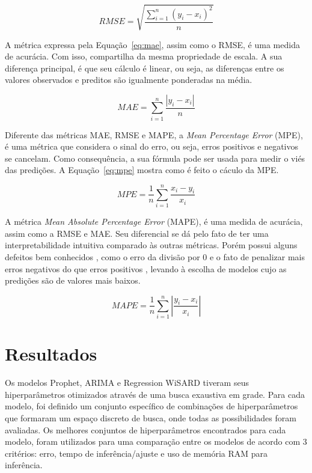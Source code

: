 \begin{equation} \label{eq:rmse}
    RMSE=\sqrt{\dfrac{\sum ^{n}_{i=1}\left( y_{i}-x_{i}\right) ^{2}}{n}}
\end{equation}

A métrica expressa pela Equação~\ref{eq:mae}, assim como o RMSE, é uma medida de acurácia. Com isso, compartilha da mesma propriedade de escala. A sua diferença principal, é que seu cálculo é linear, ou seja, as diferenças entre os valores observados e preditos são igualmente ponderadas na média.

\begin{equation} \label{eq:mae}
    MAE=\sum ^{n}_{i=1}\dfrac{\left| y_{i}-x_{i}\right| }{n}
\end{equation}

Diferente das métricas MAE, RMSE e MAPE, a \textit{Mean Percentage Error} (MPE), é uma métrica que considera o sinal do erro, ou seja, erros positivos e negativos se cancelam. Como consequência, a sua fórmula pode ser usada para medir o viés das predições. A Equação~\ref{eq:mpe} mostra como é feito o cáculo da MPE.

\begin{equation} \label{eq:mpe}
    MPE=\dfrac{1}{n}\sum ^{n}_{i=1}\dfrac{x_{i}-y_{i}}{x_{i}}
\end{equation}

A métrica \textit{Mean Absolute Percentage Error} (MAPE), é uma medida de acurácia, assim como a RMSE e MAE. Seu diferencial se dá pelo fato de ter uma interpretabilidade intuitiva comparado às outras métricas. Porém possui alguns defeitos bem conhecidos \cite{CHRISTOFALLIS2015}, como o erro da divisão por 0 e o fato de penalizar mais erros negativos do que erros positivos \cite{MAKRIDAKIS1993527}, levando à escolha de modelos cujo as predições são de valores mais baixos.

\begin{equation} \label{eq:mape}
    MAPE=\dfrac{1}{n}\sum ^{n}_{i=1}\left| \dfrac{y_{i}-x_{i}}{x_{i}}\right|
\end{equation}

\section{Resultados}
Os modelos Prophet, ARIMA e Regression WiSARD tiveram seus hiperparâmetros otimizados através de uma busca exaustiva em grade. Para cada modelo, foi definido um conjunto específico de combinações de hiperparâmetros que formaram um espaço discreto de busca, onde todas as possibilidades foram avaliadas. Os melhores conjuntos de hiperparâmetros encontrados para cada modelo, foram utilizados para uma comparação entre os modelos de acordo com 3 critérios: erro, tempo de inferência/ajuste e uso de memória RAM para inferência.

